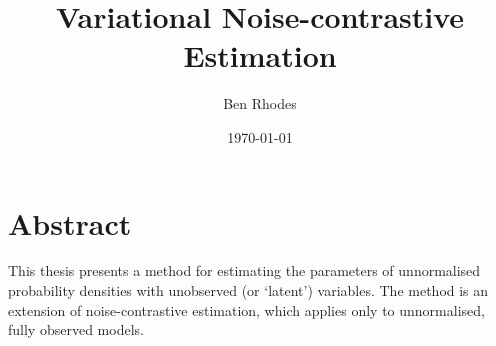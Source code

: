 \documentclass[11pt, oneside]{article}
\title{Variational Noise-contrastive Estimation}
\author{Ben Rhodes}
\date{\today}
\theoremstyle{definition}
\begin{document}
\maketitle



\section{Abstract}
This thesis presents a method for estimating the parameters of unnormalised probability densities with unobserved (or `latent’) variables. The method is an extension of noise-contrastive estimation, which applies only to unnormalised, fully observed models.


\end{document}
